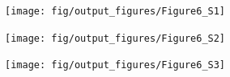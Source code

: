 \documentclass[a4paper,12pt]{article}
\newcommand{\ssc}[3]{\ensuremath{#1_{\text{#2}_{\text{#3}}}}}
\newcommand{\gE      }{\ssc{g}      {\scriptsize{E}}{}}
\newcommand{\gI      }{\ssc{g}      {\scriptsize{I}}{}}
\begin{document}
{%
%
%
%
%


\setcounter{figure}{0}
\renewcommand{\figurename}{Figure 6 - figure supplement}

\begin{figure}[ht!]
    \internallinenumbers
    \centering
        \texttt{[image: fig/output\_figures/Figure6\_S1]}
    \caption{}
\end{figure}

\clearpage

\begin{figure}[ht!]
    \internallinenumbers
    \centering
        \texttt{[image: fig/output\_figures/Figure6\_S2]}
    \caption{}
\end{figure}

\clearpage

\begin{figure}[ht!]
    \internallinenumbers
    \centering
        \texttt{[image: fig/output\_figures/Figure6\_S3]}
    \caption{}
\end{figure}

}
\end{document}
